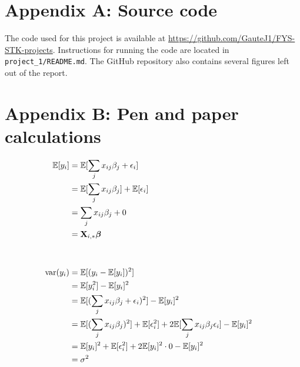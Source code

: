 \section*{Appendix A: Source code} \label{appendixA}
The code used for this project is available at \url{https://github.com/GauteJ1/FYS-STK-projects}. Instructions for running the code are located in \texttt{ project\_1/README.md}. The GitHub repository also contains several figures left out of the report. 


\section*{Appendix B: Pen and paper calculations}\label{appendixB}

\begin{align*}
    \mathbb{E}[y_i] & = \mathbb{E}[\sum_j x_{ij}\beta_j + \epsilon_i] \\
    & = \mathbb{E}[\sum_j x_{ij}\beta_j] + \mathbb{E}[\epsilon_i] \\ 
    & = \sum_j x_{ij}\beta_j + 0 \\
    & = \mathbf{X}_{i,*}\boldsymbol{\beta}
    &  \\
    &  \\
    &  \\
    \text{var}(y_i) & = \mathbb{E}[(y_i -\mathbb{E}[y_i])^2] \\
    & = \mathbb{E}[y_i^2] - \mathbb{E}[y_i]^2 \\ 
    & = \mathbb{E}[(\sum_j x_{ij}\beta_j + \epsilon_i)^2] - \mathbb{E}[y_i]^2 \\
    & = \mathbb{E}[(\sum_j x_{ij}\beta_j)^2] + \mathbb{E}[\epsilon_i^2] + 2\mathbb{E}[\sum_j x_{ij}\beta_j \epsilon_i ] - \mathbb{E}[y_i]^2 \\
    & = \mathbb{E}[y_i]^2 + \mathbb{E}[\epsilon_i^2] + 2\mathbb{E}[y_i]^2\cdot 0 - \mathbb{E}[y_i]^2 \\ 
    & = \sigma^2
\end{align*}

